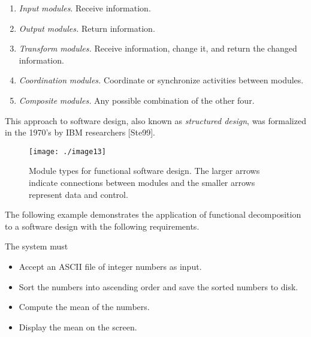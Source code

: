 \begin{enumerate}
\def\labelenumi{\arabic{enumi}.}
\item
  \emph{Input} \emph{modules}. Receive information.
\item
  \emph{Output} \emph{modules.} Return information.
\item
  \emph{Transform} \emph{modules.} Receive information, change it, and
  return the changed information.
\item
  \emph{Coordination} \emph{modules.} Coordinate or synchronize
  activities between modules.
\item
  \emph{Composite} \emph{modules.} Any possible combination of the other
  four.
\end{enumerate}

This approach to software design, also known as \emph{structured
design}, was formalized in the 1970's by IBM researchers {[}Ste99{]}.

\begin{figure}[h]
\centering
\texttt{[image: ./image13]}
\caption{Module types for functional software design. The
larger arrows indicate connections between modules and the smaller
arrows represent data and control.}
\label{figure:softwareModules}
\end{figure}

The following example demonstrates the application of functional
decomposition to a software design with the following requirements.

The system must

\begin{itemize}
\item
  Accept an ASCII file of integer numbers as input.
\item
  Sort the numbers into ascending order and save the sorted numbers to
  disk.
\item
  Compute the mean of the numbers.
\item
  Display the mean on the screen.
\end{itemize}

